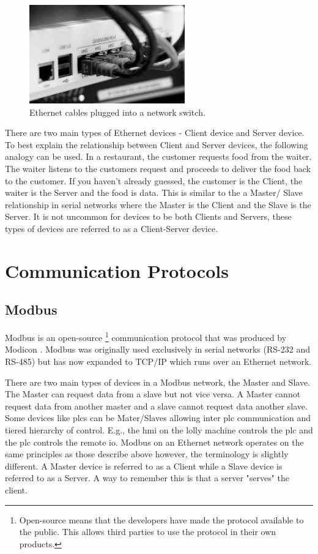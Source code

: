     \begin{figure}[H]
        \centering
        \includegraphics[width = 0.6\textwidth]{2_images/ethernetCables.png}
        \caption{Ethernet cables plugged into a network switch\cite{scott2021networking}.}
        \label{fig:ethenetCables}
    \end{figure} 

    There are two main types of Ethernet devices - Client device and Server device. To best explain the relationship between Client and Server devices, the following analogy can be used. In a restaurant, the customer requests food from the waiter. The waiter listens to the customers request and proceeds to deliver the food back to the customer. If you haven't already guessed, the customer is the Client, the waiter is the Server and the food is data. This is similar to the a Master/ Slave relationship in serial networks where the Master is the Client and the Slave is the Server. It is not uncommon for devices to be both Clients and Servers, these types of devices are referred to as a Client-Server device.
    
        
\section{Communication Protocols}
\subsection{Modbus}
    Modbus is an open-source \footnote{Open-source means that the developers have made the protocol available to the public. This allows third parties to use the protocol in their own products.} communication protocol that was produced by Modicon \cite{frenzel2015handbook}. Modbus was originally used exclusively in serial networks (RS-232 and RS-485) but has now expanded to TCP/IP which runs over an Ethernet network\cite{frenzel2015handbook}. 
    
    There are two main types of devices in a Modbus network, the Master and Slave\cite{frenzel2015handbook}. The Master can request data from a slave but not vice versa. A Master cannot request data from another master and a slave cannot request data another slave. Some devices like \acrshort{plc}s can be Mater/Slaves allowing inter \acrshort{plc} communication and tiered hierarchy of control. E.g., the \acrshort{hmi} on the lolly machine controls the \acrshort{plc} and the \acrshort{plc} controls the remote \acrshort{io}. Modbus on an Ethernet network operates on the same principles as those describe above however, the terminology is slightly different. A Master device is referred to as a Client while a Slave device is referred to as a Server. A way to remember this is that a server "serves" the client.
    
